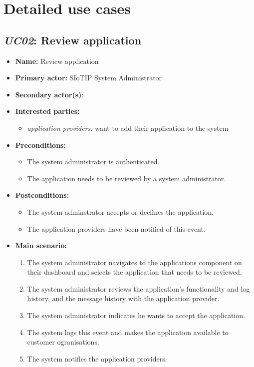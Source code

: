\section{Detailed use cases}

\subsection{\emph{UC02}: Review application}
\begin{itemize}
    \item \textbf{Name:} Review application
    \item \textbf{Primary actor:} SIoTIP System Administrator
    \item \textbf{Secondary actor(s)}:
    \item \textbf{Interested parties:}
        \begin{itemize}
            \item \textit{application providers:} want to add their application to the system
        \end{itemize}

    \item \textbf{Preconditions:}
        \begin{itemize}
            \item The system administrator is authenticated.
            \item The application needs to be reviewed by a system administrator.
        \end{itemize}

    \item \textbf{Postconditions:}
        \begin{itemize}
            \item The system adminstrator accepts or declines the application.
            \item The application providers have been notified of this event.
        \end{itemize}

    \item \textbf{Main scenario:}
        \begin{enumerate}
            \item The system administrator navigates to the applications component on their
                  dashboard and selects the application that needs to be reviewed.
            \item The system administrator reviews the application's functionality and
                  log history, and the message history with the application provider.
            \item The system administrator indicates he wants to accept the application.
            \item The system logs this event and makes the application available to
                  customer ogranisations.
            \item The system notifies the application providers.
        \end{enumerate}


\end{itemize}
